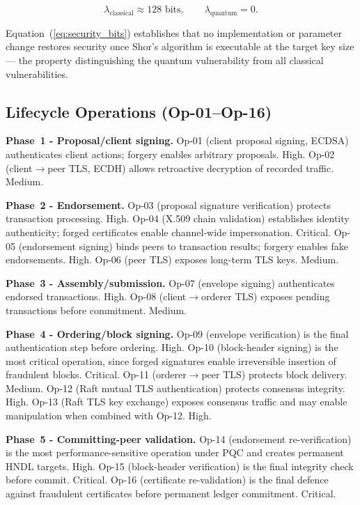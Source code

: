 \documentclass[conference]{IEEEtran}
\begin{document}
\begin{equation}
\lambda_{\mathrm{classical}} \approx 128\text{ bits},
\qquad
\lambda_{\mathrm{quantum}} = 0.
\label{eq:security_bits}
\end{equation}

Equation~(\ref{eq:security_bits}) establishes that no implementation or
parameter change restores security once Shor's algorithm is executable at the
target key size --- the property distinguishing the quantum vulnerability from
all classical vulnerabilities.

\subsection{Lifecycle Operations (Op-01--Op-16)}

\textbf{Phase~1 - Proposal/client signing.}
Op-01 (client proposal signing, ECDSA) authenticates client actions; forgery
enables arbitrary proposals. High. Op-02 (client$\rightarrow$peer TLS, ECDH)
allows retroactive decryption of recorded traffic. Medium.

\textbf{Phase~2 - Endorsement.}
Op-03 (proposal signature verification) protects transaction processing. High.
Op-04 (X.509 chain validation) establishes identity authenticity; forged
certificates enable channel-wide impersonation. Critical. Op-05 (endorsement
signing) binds peers to transaction results; forgery enables fake endorsements.
High. Op-06 (peer TLS) exposes long-term TLS keys. Medium.

\textbf{Phase~3 - Assembly/submission.}
Op-07 (envelope signing) authenticates endorsed transactions. High. Op-08
(client$\rightarrow$orderer TLS) exposes pending transactions before
commitment. Medium.

\textbf{Phase~4 - Ordering/block signing.}
Op-09 (envelope verification) is the final authentication step before ordering.
High. Op-10 (block-header signing) is the most critical operation, since forged
signatures enable irreversible insertion of fraudulent blocks. Critical.
Op-11 (orderer$\rightarrow$peer TLS) protects block delivery. Medium. Op-12
(Raft mutual TLS authentication) protects consensus integrity. High. Op-13
(Raft TLS key exchange) exposes consensus traffic and may enable manipulation
when combined with Op-12. High.

\textbf{Phase~5 - Committing-peer validation.}
Op-14 (endorsement re-verification) is the most performance-sensitive operation
under PQC and creates permanent HNDL targets. High. Op-15 (block-header
verification) is the final integrity check before commit. Critical. Op-16
(certificate re-validation) is the final defence against fraudulent
certificates before permanent ledger commitment. Critical.
\end{document}
